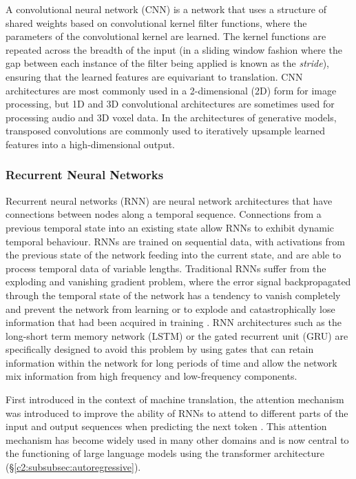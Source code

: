 A convolutional neural network (CNN) \citep{fukushima1982neocognitron} is a network that uses a structure of shared weights based on convolutional kernel filter functions, where the parameters of the convolutional kernel are learned. 
The kernel functions are repeated across the breadth of the input (in a sliding window fashion where the gap between each instance of the filter being applied is known as the \textit{stride}), ensuring that the learned features are equivariant to translation. 
CNN architectures are most commonly used in a 2-dimensional (2D) form for image processing, but 1D and 3D convolutional architectures are sometimes used for processing audio and 3D voxel data. 
In the architectures of generative models, transposed convolutions are commonly used to iteratively upsample learned features into a high-dimensional output.

\subsubsection{Recurrent Neural Networks}
\label{c2:subsubsec:rnn}

Recurrent neural networks (RNN) are neural network architectures that have connections between nodes along a temporal sequence. 
Connections from a previous temporal state into an existing state allow RNNs to exhibit dynamic temporal behaviour. RNNs are trained on sequential data, with activations from the previous state of the network feeding into the current state, and are able to process temporal data of variable lengths. 
Traditional RNNs suffer from the exploding and vanishing gradient problem, where the error signal backpropagated through the temporal state of the network has a tendency to vanish completely and prevent the network from learning or to explode and catastrophically lose information that had been acquired in training \cite{hochreiter1998vanishing}. 
RNN architectures such as the long-short term memory network (LSTM) \citep{hochreiter1997long} or the gated recurrent unit (GRU) \citep{cho2014properties} are specifically designed to avoid this problem by using gates that can retain information within the network for long periods of time and allow the network mix information from high frequency and low-frequency components. 

First introduced in the context of machine translation, the attention mechanism was introduced to improve the ability of RNNs to attend to different parts of the input and output sequences when predicting the next token \citep{bahdanau2014neural}. 
This attention mechanism has become widely used in many other domains and is now central to the functioning of large language models using the transformer architecture (\S \ref{c2:subsubsec:autoregressive}).

